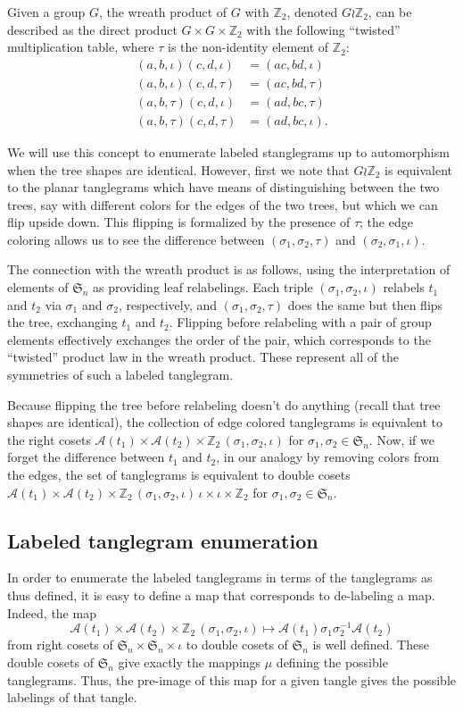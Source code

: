 \documentclass{amsart}
\newcommand{\ZZ}{\mathbb Z}
\newcommand{\fS}{\mathfrak S}
\newcommand{\aut}{\mathcal A}
\newcommand{\pairing}{\mu}
\newcommand{\id}{\iota}
\newcommand{\wrtwo}{\wr \ZZ_2}
\begin{document}
Given a group $G$, the wreath product of $G$ with $\ZZ_2$, denoted $G \wrtwo$, can be described as the direct product $G \times G \times \ZZ_2$ with the following ``twisted'' multiplication table, where $\tau$ is the non-identity element of $\ZZ_2$:
\begin{align*}
(a, b, \id) (c, d, \id) & = (ac, bd, \id) \\
(a, b, \id) (c, d, \tau) & = (ac, bd, \tau) \\
(a, b, \tau) (c, d, \id) & = (ad, bc, \tau) \\
(a, b, \tau) (c, d, \tau) & = (ad, bc, \id).
\end{align*}

We will use this concept to enumerate labeled stanglegrams up to automorphism when the tree shapes are identical.
However, first we note that $G \wrtwo$ is equivalent to the planar tanglegrams which have means of distinguishing between the two trees, say with different colors for the edges of the two trees, but which we can flip upside down.
This flipping is formalized by the presence of $\tau$; the edge coloring allows us to see the difference between $(\sigma_1, \sigma_2, \tau)$ and $(\sigma_2, \sigma_1, \id)$.

The connection with the wreath product is as follows, using the interpretation of elements of $\fS_n$ as providing leaf relabelings.
Each triple $(\sigma_1, \sigma_2, \id)$ relabels $t_1$ and $t_2$ via $\sigma_1$ and $\sigma_2$, respectively, and $(\sigma_1, \sigma_2, \tau)$ does the same but then flips the tree, exchanging $t_1$ and $t_2$.
Flipping before relabeling with a pair of group elements effectively exchanges the order of the pair, which corresponds to the ``twisted'' product law in the wreath product.
These represent all of the symmetries of such a labeled tanglegram.

Because flipping the tree before relabeling doesn't do anything (recall that tree shapes are identical), the collection of edge colored tanglegrams is equivalent to the right cosets $\aut(t_1) \times \aut(t_2) \times \ZZ_2 \, (\sigma_1, \sigma_2, \id)$ for $\sigma_1, \sigma_2 \in \fS_n$.
Now, if we forget the difference between $t_1$ and $t_2$, in our analogy by removing colors from the edges, the set of tanglegrams is equivalent to double cosets
$\aut(t_1) \times \aut(t_2) \times \ZZ_2 \, (\sigma_1, \sigma_2, \id) \, {\id} \times {\id} \times \ZZ_2$ for $\sigma_1, \sigma_2 \in \fS_n$.


\subsection{Labeled tanglegram enumeration}
In order to enumerate the labeled tanglegrams in terms of the tanglegrams as thus defined, it is easy to define a map that corresponds to de-labeling a map.
Indeed, the map
\[
\aut(t_1) \times \aut(t_2) \times \ZZ_2 \, (\sigma_1, \sigma_2, \id) \mapsto \aut(t_1) \sigma_1 \sigma_2^{-1} \aut(t_2)
\]
from right cosets of $\fS_n \times \fS_n \times \id$ to double cosets of $\fS_n$ is well defined.
These double cosets of $\fS_n$ give exactly the mappings $\pairing$ defining the possible tanglegrams.
Thus, the pre-image of this map for a given tangle gives the possible labelings of that tangle.
\end{document}
